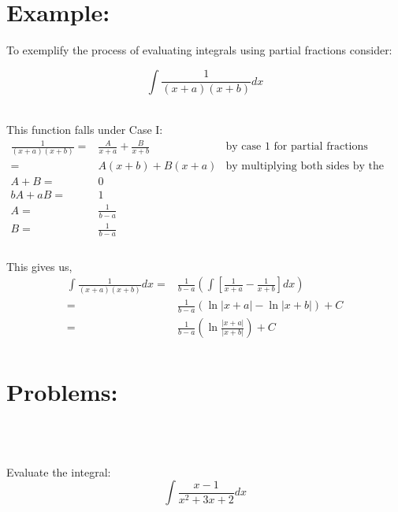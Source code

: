 \documentclass[10pt,letterpaper,cm]{hmcpset}
\begin{document}
\section*{Example:}


\begin{problem}
To exemplify the process of evaluating integrals using partial fractions consider:

  \begin{equation*}
    \int\frac{1}{(x+a)(x+b)}dx 
  \end{equation*}
\end{problem}\\
  This function falls under Case I:
  \begin{align*}
      \frac{1}{(x+a)(x+b)} =& \frac{A}{x+a} + \frac{B}{x+b} & \text{by case 1 for partial fractions}\\
       =&A(x+b) + B(x+a) &\text{by multiplying both sides by the denominator}\\
   A+B =& 0 \\
   bA + aB=& 1 \\
   A =&\frac{1}{b-a} \\ 
   B =&\frac{1}{b-a} \\
  \end{align*}
\\
This gives us,
\begin{align*}
  \int\frac{1}{(x+a)(x+b)}dx=&\frac{1}{b-a}\left(  \int\left[ \frac{1}{x+a}- \frac{1}{x+b}\right] 
  dx\right)\\
  =&\frac{1}{b-a}\left(\ln|x+a|-\ln|x+b|\right)+C\\
  =& \frac{1}{b-a}\left(\ln\frac{|x+a|}{|x+b|}\right)+C \\
\end{align*}
\newpage
\section*{Problems:}\\
\\
\begin{problem}[1]
  Evaluate the integral:
    \begin{equation*}
      \int\frac{x-1}{x^2 + 3x + 2}dx
    \end{equation*}
\end{problem}\\
\end{document}
